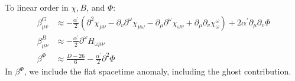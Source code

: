 To linear order in $\chi, B$, and $\Phi$:
\begin{subequations}\label{3.7.13}
\begin{align}
	\beta_{\mu v}^{G} &\approx-\frac{\alpha^{\prime}}{2}\left(\partial^{2} \chi_{\mu \nu}-\partial_{v} \partial^{\omega} \chi_{\mu \omega}-\partial_{\mu} \partial^{\omega} \chi_{\omega v}+\partial_{\mu} \partial_{v} \chi_{\omega}^{\omega}\right)+2 \alpha^{\prime} \partial_{\mu} \partial_{v} \Phi\\
	\beta_{\mu \nu}^{B} &\approx-\frac{\alpha^{\prime}}{2} \partial^{\omega} H_{\omega \mu \nu}\\
	\beta^{\Phi} &\approx \frac{D-26}{6}-\frac{\alpha^{\prime}}{2} \partial^{2} \Phi
\end{align}
\end{subequations}
In $\beta^\Phi$, we include the flat spacetime anomaly, including the ghost contribution.
